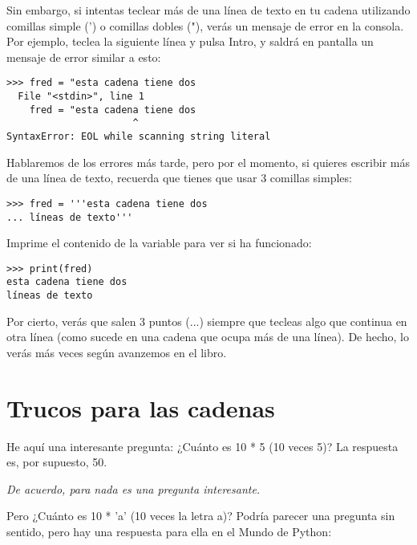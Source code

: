 Sin embargo, si intentas teclear más de una línea de texto en tu cadena utilizando comillas simple (') o comillas dobles ("), verás un mensaje de error en la consola. Por ejemplo, teclea la siguiente línea y pulsa Intro, y saldrá en pantalla un mensaje de error similar a esto:

\begin{listing}
\begin{verbatim}
>>> fred = "esta cadena tiene dos
  File "<stdin>", line 1
    fred = "esta cadena tiene dos
                      ^
SyntaxError: EOL while scanning string literal
\end{verbatim}
\end{listing}

Hablaremos de los errores más tarde, pero por el momento, si quieres escribir más de una línea de texto, recuerda que tienes que usar 3 comillas simples:

\begin{listing}
\begin{verbatim}
>>> fred = '''esta cadena tiene dos
... líneas de texto'''
\end{verbatim}
\end{listing}

\noindent
Imprime el contenido de la variable para ver si ha funcionado:

\begin{listing}
\begin{verbatim}
>>> print(fred)
esta cadena tiene dos
líneas de texto
\end{verbatim}
\end{listing}

Por cierto, verás que salen 3 puntos (...) siempre que tecleas algo que continua en otra línea (como sucede en una cadena que ocupa más de una línea). De hecho, lo verás más veces según avanzemos en el libro.

\section{Trucos para las cadenas}\label{trickswithstrings}

He aquí una interesante pregunta: ¿Cuánto es 10 * 5 (10 veces 5)? La respuesta es, por supuesto, 50.

\noindent
\emph{De acuerdo, para nada es una pregunta interesante.}

Pero ¿Cuánto es 10 * 'a' (10 veces la letra a)? Podría parecer una pregunta sin sentido, pero hay una respuesta para ella en el Mundo de Python:

